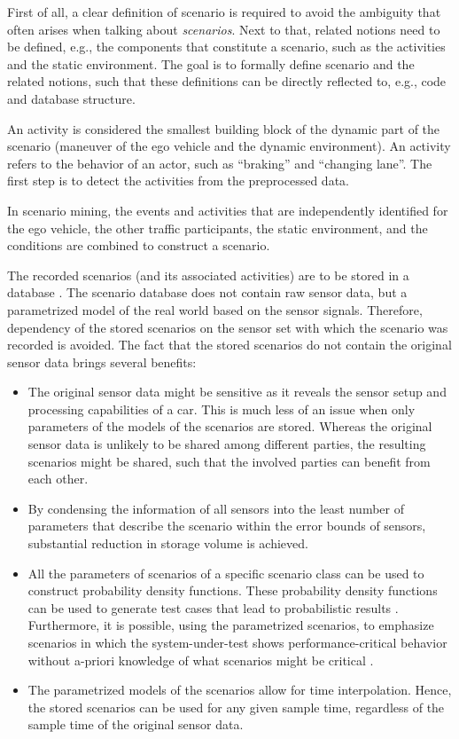 

First of all, a clear definition of scenario is required to avoid the ambiguity that often arises when talking about \emph{scenarios}. Next to that, related notions need to be defined, e.g., the components that constitute a scenario, such as the activities and the static environment. The goal is to formally define scenario and the related notions, such that these definitions can be directly reflected to, e.g., code and database structure.

An activity is considered the smallest building block of the dynamic part of the scenario (maneuver of the ego vehicle and the dynamic environment). An activity refers to the behavior of an actor, such as ``braking'' and ``changing lane''. The first step is to detect the activities from the preprocessed data. 

In scenario mining, the events and activities that are independently identified for the ego vehicle, the other traffic participants, the static environment, and the conditions are combined to construct a scenario. 

The recorded scenarios (and its associated activities) are to be stored in a database \cite{elrofai2018scenario}. The scenario database does not contain raw sensor data, but a parametrized model of the real world based on the sensor signals. Therefore, dependency of the stored scenarios on the sensor set with which the scenario was recorded is avoided. The fact that the stored scenarios do not contain the original sensor data brings several benefits: 
\begin{itemize}
	\item The original sensor data might be sensitive as it reveals the sensor setup and processing capabilities of a car. This is much less of an issue when only parameters of the models of the scenarios are stored. Whereas the original sensor data is unlikely to be shared among different parties, the resulting scenarios might be shared, such that the involved parties can benefit from each other.
	\item By condensing the information of all sensors into the least number of parameters that describe the scenario within the error bounds of sensors, substantial reduction in storage volume is achieved.
	\item All the parameters of scenarios of a specific scenario class can be used to construct probability density functions. These probability density functions can be used to generate test cases that lead to probabilistic results \cite{deGelder2017assessment}. Furthermore, it is possible, using the parametrized scenarios, to emphasize scenarios in which the system-under-test shows performance-critical behavior without a-priori knowledge of what scenarios might be critical \cite{deGelder2017assessment}. 
	\item The parametrized models of the scenarios allow for time interpolation. Hence, the stored scenarios can be used for any given sample time, regardless of the sample time of the original sensor data. 
\end{itemize}

